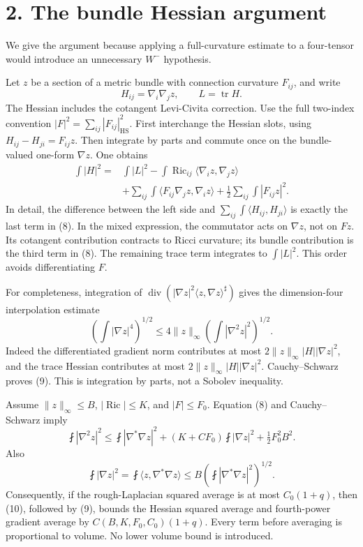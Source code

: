 \documentclass[
  11pt,
]{article}
\begin{document}
\hypertarget{the-bundle-hessian-argument}{%
\section{2. The bundle Hessian
argument}\label{the-bundle-hessian-argument}}

We give the argument because applying a full-curvature estimate to a
four-tensor would introduce an unnecessary \(W^-\) hypothesis.

Let \(z\) be a section of a metric bundle with connection curvature
\(F_{ij}\), and write \[
 H_{ij}=\nabla_i\nabla_j z,\qquad L=\operatorname{tr}H.
\] The Hessian includes the cotangent Levi-Civita correction. Use the
full two-index convention \(|F|^2=\sum_{ij}|F_{ij}|_{\mathrm{HS}}^2\).
First interchange the Hessian slots, using \(H_{ij}-H_{ji}=F_{ij}z\).
Then integrate by parts and commute once on the bundle-valued one-form
\(\nabla z\). One obtains \[
\begin{split}
 \int|H|^2={}&\int|L|^2
 -\int\operatorname{Ric}_{ij}\langle\nabla_i z,\nabla_j z\rangle\\
 &+\sum_{ij}\int\langle F_{ij}\nabla_j z,\nabla_i z\rangle
 +\frac12\sum_{ij}\int|F_{ij}z|^2.
\end{split}
 \tag{8}
\] In detail, the difference between the left side and
\(\sum_{ij}\int\langle H_{ij},H_{ji}\rangle\) is exactly the last term
in (8). In the mixed expression, the commutator acts on \(\nabla z\),
not on \(Fz\). Its cotangent contribution contracts to Ricci curvature;
its bundle contribution is the third term in (8). The remaining trace
term integrates to \(\int|L|^2\). This order avoids differentiating
\(F\).

For completeness, integration of
\(\operatorname{div}(|\nabla z|^2\langle z,\nabla z\rangle^\sharp)\)
gives the dimension-four interpolation estimate \[
 \left(\int|\nabla z|^4\right)^{1/2}
             \le4\|z\|_\infty\left(\int|\nabla^2z|^2\right)^{1/2}.
 \tag{9}
\] Indeed the differentiated gradient norm contributes at most
\(2\|z\|_\infty|H||\nabla z|^2\), and the trace Hessian contributes at
most \(2\|z\|_\infty|H||\nabla z|^2\). Cauchy--Schwarz proves (9). This
is integration by parts, not a Sobolev inequality.

Assume \(\|z\|_\infty\le B\), \(|\operatorname{Ric}|\le K\), and
\(|F|\le F_0\). Equation (8) and Cauchy--Schwarz imply \[
 \fint|\nabla^2z|^2\le
 \fint|\nabla^*\nabla z|^2
 +(K+C F_0)\fint|\nabla z|^2+\tfrac12 F_0^2B^2.
 \tag{10}
\] Also \[
 \fint|\nabla z|^2
   =\fint\langle z,\nabla^*\nabla z\rangle
   \le B\left(\fint|\nabla^*\nabla z|^2\right)^{1/2}.
 \tag{11}
\] Consequently, if the rough-Laplacian squared average is at most
\(C_0(1+q)\), then (10), followed by (9), bounds the Hessian squared
average and fourth-power gradient average by \(C(B,K,F_0,C_0)(1+q)\).
Every term before averaging is proportional to volume. No lower volume
bound is introduced.
\end{document}
